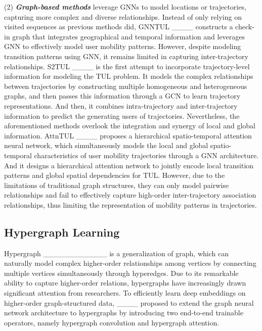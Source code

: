 (2) \textbf{\textit{Graph-based methods}} leverage GNNs to model locations or trajectories, capturing more complex and diverse relationships. Instead of only relying on visited sequences as previous methods did, GNNTUL ____ constructs a check-in graph that integrates geographical and temporal information and leverages GNN to effectively model user mobility patterns. However, despite modeling transition patterns using GNN, it remains limited in capturing inter-trajectory relationships.
S2TUL ____ is the first attempt to incorporate trajectory-level information for modeling the TUL problem. It models the complex relationships between trajectories by constructing multiple homogeneous and heterogeneous graphs, and then passes this information through a GCN to learn trajectory representations. And then, it combines intra-trajectory and inter-trajectory information to predict the generating users of trajectories.
Nevertheless, the aforementioned methods overlook the integration and synergy of local and global information. AttnTUL ____ proposes a hierarchical spatio-temporal attention neural network, which simultaneously models the local and global spatio-temporal characteristics of user mobility trajectories through a GNN architecture. And it designs a hierarchical attention network to jointly encode local transition patterns and global spatial dependencies for TUL. However, due to the limitations of traditional graph structures, they can only model pairwise relationships and fail to effectively capture high-order inter-trajectory association relationships, thus limiting the representation of mobility patterns in trajectories.

\subsection{Hypergraph Learning}

Hypergraph ____________ is a generalization of graph, which can naturally model complex higher-order relationships among vertices by connecting multiple vertices simultaneously through hyperedges. Due to its remarkable ability to capture higher-order relations, hypergraphs have increasingly drawn significant attention from researchers. To efficiently learn deep embeddings on higher-order graph-structured data, ____ proposed to extend the graph neural network architecture to hypergraphs by introducing two end-to-end trainable operators, namely hypergraph convolution and hypergraph attention.

